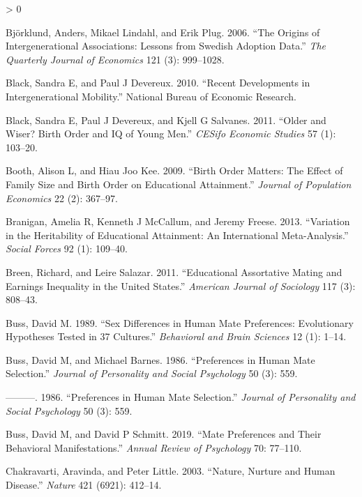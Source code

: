 \documentclass[
]{article}
\newlength{\cslhangindent}
\newenvironment{CSLReferences}[2] %
 {%
  \setlength{\parindent}{0pt}
  \ifodd #1 \everypar{\setlength{\hangindent}{\cslhangindent}}\ignorespaces\fi
  \ifnum #2 > 0
  \setlength{\parskip}{#2\baselineskip}
  \fi
 }%
 {}
\begin{document}
\begin{CSLReferences}{1}{0}
\leavevmode\hypertarget{ref-bjorklund2006origins}{}%
Björklund, Anders, Mikael Lindahl, and Erik Plug. 2006. {``The Origins of Intergenerational Associations: Lessons from Swedish Adoption Data.''} \emph{The Quarterly Journal of Economics} 121 (3): 999--1028.

\leavevmode\hypertarget{ref-black2010recent}{}%
Black, Sandra E, and Paul J Devereux. 2010. {``Recent Developments in Intergenerational Mobility.''} National Bureau of Economic Research.

\leavevmode\hypertarget{ref-black2011older}{}%
Black, Sandra E, Paul J Devereux, and Kjell G Salvanes. 2011. {``Older and Wiser? Birth Order and IQ of Young Men.''} \emph{CESifo Economic Studies} 57 (1): 103--20.

\leavevmode\hypertarget{ref-booth2009birth}{}%
Booth, Alison L, and Hiau Joo Kee. 2009. {``Birth Order Matters: The Effect of Family Size and Birth Order on Educational Attainment.''} \emph{Journal of Population Economics} 22 (2): 367--97.

\leavevmode\hypertarget{ref-branigan2013variation}{}%
Branigan, Amelia R, Kenneth J McCallum, and Jeremy Freese. 2013. {``Variation in the Heritability of Educational Attainment: An International Meta-Analysis.''} \emph{Social Forces} 92 (1): 109--40.

\leavevmode\hypertarget{ref-breen2011educational}{}%
Breen, Richard, and Leire Salazar. 2011. {``Educational Assortative Mating and Earnings Inequality in the United States.''} \emph{American Journal of Sociology} 117 (3): 808--43.

\leavevmode\hypertarget{ref-buss1989sex}{}%
Buss, David M. 1989. {``Sex Differences in Human Mate Preferences: Evolutionary Hypotheses Tested in 37 Cultures.''} \emph{Behavioral and Brain Sciences} 12 (1): 1--14.

\leavevmode\hypertarget{ref-buss1986preferences}{}%
Buss, David M, and Michael Barnes. 1986. {``Preferences in Human Mate Selection.''} \emph{Journal of Personality and Social Psychology} 50 (3): 559.

\leavevmode\hypertarget{ref-buss1986preferences}{}%
---------. 1986. {``Preferences in Human Mate Selection.''} \emph{Journal of Personality and Social Psychology} 50 (3): 559.

\leavevmode\hypertarget{ref-buss2019mate}{}%
Buss, David M, and David P Schmitt. 2019. {``Mate Preferences and Their Behavioral Manifestations.''} \emph{Annual Review of Psychology} 70: 77--110.

\leavevmode\hypertarget{ref-chakravarti2003nature}{}%
Chakravarti, Aravinda, and Peter Little. 2003. {``Nature, Nurture and Human Disease.''} \emph{Nature} 421 (6921): 412--14.


\end{CSLReferences}
\end{document}
